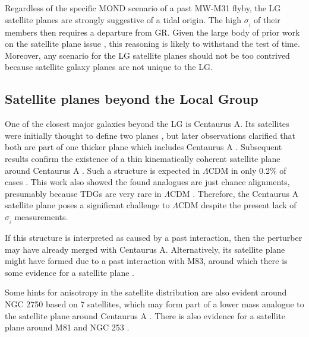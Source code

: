 \documentclass[fleqn,usenatbib,useAMS]{mnras} %
\begin{document}
Regardless of the specific MOND scenario of a past MW-M31 flyby, the LG satellite planes are strongly suggestive of a tidal origin. The high $\sigma_{_i}$ of their members then requires a departure from GR. Given the large body of prior work on the satellite plane issue \citep[reviewed in][]{Pawlowski_2018, Pawlowski_2021}, this reasoning is likely to withstand the test of time. Moreover, any scenario for the LG satellite planes should not be too contrived because satellite galaxy planes are not unique to the LG.



\subsection{Satellite planes beyond the Local Group}
\label{Satellite_planes_beyond_Local_Group}

One of the closest major galaxies beyond the LG is Centaurus A. Its satellites were initially thought to define two planes \citep{Tully_2015_Cen_A}, but later observations clarified that both are part of one thicker plane which includes Centaurus A \citep{Muller_2016}. Subsequent results confirm the existence of a thin kinematically coherent satellite plane around Centaurus A \citep{Muller_2018}. Such a structure is expected in $\Lambda$CDM in only 0.2\% of cases \citep{Muller_2021}. This work also showed the found analogues are just chance alignments, presumably because TDGs are very rare in $\Lambda$CDM \citep[see figure~16 of][]{Haslbauer_2019}. Therefore, the Centaurus A satellite plane poses a significant challenge to $\Lambda$CDM despite the present lack of $\sigma_{_i}$ measurements.

If this structure is interpreted as caused by a past interaction, then the perturber may have already merged with Centaurus A. Alternatively, its satellite plane might have formed due to a past interaction with M83, around which there is some evidence for a satellite plane \citep{Muller_2018_M83}.

Some hints for anisotropy in the satellite distribution are also evident around NGC 2750 based on 7 satellites, which may form part of a lower mass analogue to the satellite plane around Centaurus A \citep{Paudel_2021}. There is also evidence for a satellite plane around M81 \citep{Chiboucas_2013} and NGC 253 \citep{Delgado_2021, Mutlu_2022}.
\end{document}
